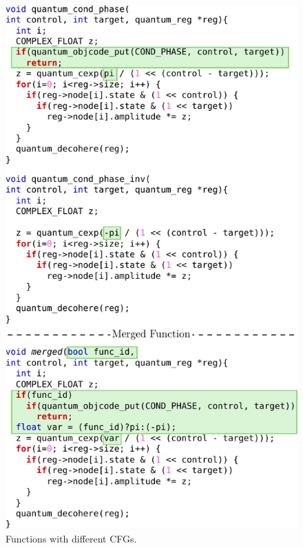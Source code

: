 \begin{figure}[t!]
  \centering
  \includegraphics[width=\linewidth]{figs/libquantum-example.pdf}
  \caption{Functions with different CFGs.}
  \label{fig:libquantum-example}
\end{figure}

